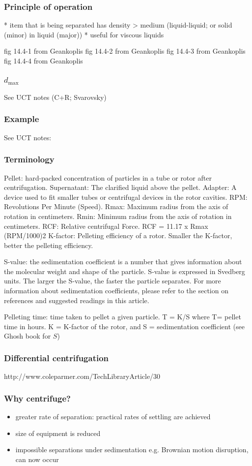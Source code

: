 \begin{frame}\frametitle{Principle of operation}
	* item that is being separated has density > medium (liquid-liquid; or solid (minor) in liquid (major))
	* useful for viscous liquids
	
	fig 14.4-1 from Geankoplis
	fig 14.4-2 from Geankoplis
	fig 14.4-3 from Geankoplis
	fig 14.4-4 from Geankoplis
\end{frame}

\begin{frame}\frametitle{$d_\text{max}$}
	See UCT notes (C+R; Svarovsky)
\end{frame}

\begin{frame}\frametitle{Example}
	See UCT notes:
\end{frame}

\begin{frame}\frametitle{Terminology}
	Pellet: hard-packed concentration of particles in a tube or rotor after centrifugation.
	Supernatant: The clarified liquid above the pellet.
	Adapter: A device used to fit smaller tubes or centrifugal devices in the rotor cavities.
	RPM: Revolutions Per Minute (Speed).
	Rmax: Maximum radius from the axis of rotation in centimeters.
	Rmin: Minimum radius from the axis of rotation in centimeters.
	RCF: Relative centrifugal Force. RCF = 11.17 x Rmax (RPM/1000)2
	K-factor: Pelleting efficiency of a rotor. Smaller the K-factor, better the pelleting efficiency.

	S-value: the sedimentation coefficient is a number that gives information about the molecular weight and shape of the particle. S-value is expressed in Svedberg units. The larger the S-value, the faster the particle separates.
	For more information about sedimentation coefficients, please refer to the section on references and suggested readings in this article.

	Pelleting time: time taken to pellet a given particle. T = K/S where T= pellet time in hours. K = K-factor of the rotor, and S = sedimentation coefficient (see Ghosh book for $S$)
\end{frame}

\begin{frame}\frametitle{Differential centrifugation}
	http://www.coleparmer.com/TechLibraryArticle/30
\end{frame}


\begin{frame}\frametitle{Why centrifuge?}
	\begin{itemize}
		\item	greater rate of separation: practical rates of settling are achieved
		\item	size of equipment is reduced
		\item	impossible separations under sedimentation e.g. Brownian motion disruption, can now occur 
	\end{itemize}
\end{frame}

